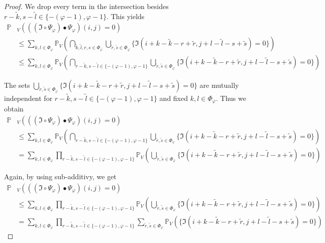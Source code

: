 \documentclass[a4paper,12pt]{article}
\theoremstyle{plain}
\theoremstyle{definition}
\begin{document}
\begin{proof}
	We drop every term in the intersection besides $r - \tilde{k}, s - \tilde{l} \in \{ - ( \varphi - 1 ), \varphi - 1 \}$. This yields
	\begin{align*}
		\mathbb{P}&_V( ((\mathfrak{I} \circ \Psi_\varphi) \bullet \Psi_\varphi)(i, j) = 0 ) \\
		&\leq \sum_{k, l \in \Phi_\varphi} \mathbb{P}_V\left( \bigcap_{\tilde{k}, \tilde{l}, r, s \in \Phi_\varphi} \bigcup_{\tilde{r}, \tilde{s} \in \Phi_\varphi} \{ \mathfrak{I}(i + k - \tilde{k} - r + \tilde{r}, j + l - \tilde{l} - s + \tilde{s}) = 0 \} \right) \\
		&\leq \sum_{k, l \in \Phi_\varphi} \mathbb{P}_V\left( \bigcap_{r - \tilde{k}, s - \tilde{l} \in \{ - ( \varphi - 1 ), \varphi - 1 \}} \bigcup_{\tilde{r}, \tilde{s} \in \Phi_\varphi} \{ \mathfrak{I}(i + k - \tilde{k} - r + \tilde{r}, j + l - \tilde{l} - s + \tilde{s}) = 0 \} \right)
	\end{align*}
	
	The sets $\bigcup_{\tilde{r}, \tilde{s} \in \Phi_\varphi} \{ \mathfrak{I}(i + k - \tilde{k} - r + \tilde{r}, j + l - \tilde{l} - s + \tilde{s}) = 0 \}$ are mutually independent for $r - \tilde{k}, s - \tilde{l} \in \{ - ( \varphi - 1 ), \varphi - 1 \}$ and fixed $k, l \in \Phi_\varphi$. Thus we obtain
	\begin{align*}
		\mathbb{P}&_V( ((\mathfrak{I} \circ \Psi_\varphi) \bullet \Psi_\varphi)(i, j) = 0 ) \\
		&\leq \sum_{k, l \in \Phi_\varphi} \mathbb{P}_V\left( \bigcap_{r - \tilde{k}, s - \tilde{l} \in \{ - ( \varphi - 1 ), \varphi - 1 \}} \bigcup_{\tilde{r}, \tilde{s} \in \Phi_\varphi} \{ \mathfrak{I}(i + k - \tilde{k} - r + \tilde{r}, j + l - \tilde{l} - s + \tilde{s}) = 0 \} \right) \\
		&= \sum_{k, l \in \Phi_\varphi} \prod_{r - \tilde{k}, s - \tilde{l} \in \{ - ( \varphi - 1 ), \varphi - 1 \}} \mathbb{P}_V\left( \bigcup_{\tilde{r}, \tilde{s} \in \Phi_\varphi} \{ \mathfrak{I}(i + k - \tilde{k} - r + \tilde{r}, j + l - \tilde{l} - s + \tilde{s}) = 0 \} \right)
	\end{align*}
	
	Again, by using sub-additivy, we get
	\begin{align*}
		\mathbb{P}&_V( ((\mathfrak{I} \circ \Psi_\varphi) \bullet \Psi_\varphi)(i, j) = 0 ) \\
		&\leq \sum_{k, l \in \Phi_\varphi} \prod_{r - \tilde{k}, s - \tilde{l} \in \{ - ( \varphi - 1 ), \varphi - 1 \}} \mathbb{P}_V\left( \bigcup_{\tilde{r}, \tilde{s} \in \Phi_\varphi} \{ \mathfrak{I}(i + k - \tilde{k} - r + \tilde{r}, j + l - \tilde{l} - s + \tilde{s}) = 0 \} \right) \\
		&= \sum_{k, l \in \Phi_\varphi} \prod_{r - \tilde{k}, s - \tilde{l} \in \{ - ( \varphi - 1 ), \varphi - 1 \}} \sum_{\tilde{r}, \tilde{s} \in \Phi_\varphi} \mathbb{P}_V\left( \{ \mathfrak{I}(i + k - \tilde{k} - r + \tilde{r}, j + l - \tilde{l} - s + \tilde{s}) = 0 \} \right)
	\end{align*}
	

\end{proof}
\end{document}
